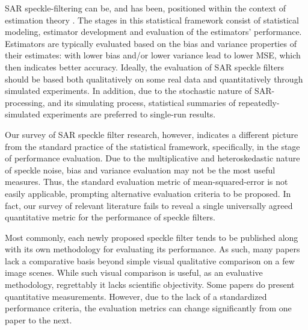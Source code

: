 SAR speckle-filtering can be, and has been, positioned within the context of estimation theory \cite{Touzi_2002_TGRS}. 
The stages in this statistical framework consist of statistical modeling, estimator development and evaluation of the estimators' performance. 
Estimators are typically evaluated based on the bias and variance properties of their estimates:
  with lower bias and/or lower variance lead to lower MSE, which then indicates better accuracy.
Ideally, the evaluation of SAR speckle filters should be based both qualitatively on some real data and quantitatively through simulated experiments. 
In addition, due to the stochastic nature of SAR-processing, and its simulating process, 
	statistical summaries of repeatedly-simulated experiments are preferred to single-run results.

Our survey of SAR speckle filter research, however, indicates 
	a different picture from the standard practice of the statistical framework, 
	specifically, in the stage of performance evaluation. 
Due to the multiplicative and heteroskedastic nature of speckle noise, 
	bias and variance evaluation may not be the most useful measures. 
Thus, the standard evaluation metric of mean-squared-error is not easily applicable,
	prompting alternative evaluation criteria to be proposed.
In fact, our survey of relevant literature fails to reveal 
	a single universally agreed quantitative metric for the performance of speckle filters.

Most commonly, each newly proposed speckle filter tends to be published along with its own methodology for evaluating its 
	performance. 
As such, many papers lack a comparative basis beyond simple visual qualitative comparison on a few image scenes. 
While such visual comparison is useful, as an evaluative methodology, regrettably it lacks scientific objectivity. 
Some papers do present quantitative measurements. 
However, due to the lack of a standardized performance criteria, 
	the evaluation metrics can change significantly from one paper to the next.

